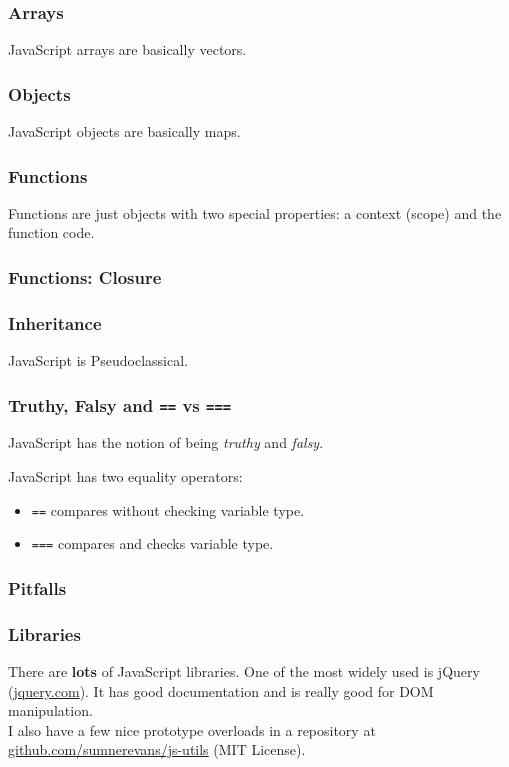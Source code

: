 \documentclass{lug}
\begin{document}
\begin{frame}
    \frametitle{Arrays}

    JavaScript arrays are basically vectors.
\end{frame}

\begin{frame}
    \frametitle{Objects}

    JavaScript objects are basically maps.
\end{frame}

\begin{frame}
    \frametitle{Functions}

    Functions are just objects with two special properties: a context (scope) and the function code.
\end{frame}

\begin{frame}
    \frametitle{Functions: Closure}

\end{frame}

\begin{frame}
    \frametitle{Inheritance}
    JavaScript is Pseudoclassical.

\end{frame}

\begin{frame}
    \frametitle{Truthy, Falsy and \texttt{==} vs \texttt{===}}

    JavaScript has the notion of being \textit{truthy} and \textit{falsy}.

    JavaScript has two equality operators:
    \begin{itemize}
        \item \texttt{==} compares without checking variable type.
        \item \texttt{===} compares and checks variable type.
    \end{itemize}
\end{frame}

\begin{frame}
    \frametitle{Pitfalls}

\end{frame}

\begin{frame}
    \frametitle{Libraries}

    There are \textbf{lots} of JavaScript libraries. One of the most widely used is jQuery
    (\href{http://jquery.com/}{jquery.com}). It has good documentation and is really good for DOM
    manipulation.\\

    I also have a few nice prototype overloads in a repository at
    \href{https://github.com/sumnerevans/js-utils}{github.com/sumnerevans/js-utils} (MIT License).

\end{frame}
\end{document}
